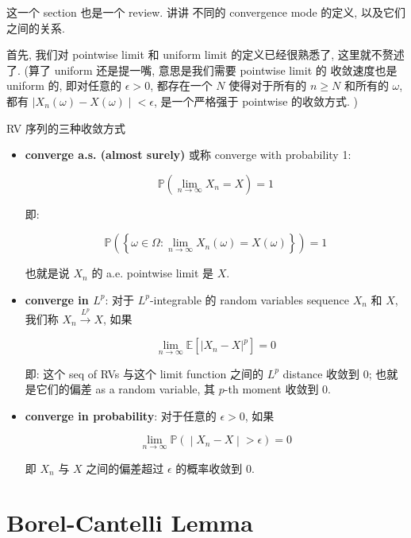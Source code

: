\documentclass{qlnotes-export}
\begin{document}
这一个 section 也是一个 review. 讲讲 不同的 convergence mode 的定义, 以及它们之间的关系.

首先, 我们对 pointwise limit 和 uniform limit 的定义已经很熟悉了, 这里就不赘述了. (算了 uniform 还是提一嘴, 意思是我们需要 pointwise limit 的 收敛速度也是 uniform 的, 即对任意的 \(\epsilon > 0\), 都存在一个 \(N\) 使得对于所有的 \(n \geq N\) 和所有的 \(\omega\), 都有 \(\left. |X_{n}(\omega) - X(\omega) \middle| < \epsilon \right.\), 是一个严格强于 pointwise 的收敛方式. )

\begin{definition}{RV 序列的三种收敛方式}\label{def-04-lln-rv}

\begin{itemize}
\item
  \textbf{converge a.s. (almost surely)} 或称 converge with probability 1:

  \[{\mathbb{P}}\left( {\lim\limits_{n\rightarrow\infty}X_{n} = X} \right) = 1\]

  即:

  \[{\mathbb{P}}\left( \left\{ {\omega \in \Omega:\lim\limits_{n\rightarrow\infty}X_{n}(\omega) = X(\omega)} \right\} \right) = 1\]

  也就是说 \(X_{n}\) 的 a.e. pointwise limit 是 \(X\).
\item
  \textbf{converge in \(L^{p}\)}: 对于 \(L^{p}\)-integrable 的 random variables sequence \(X_{n}\) 和 \(X\), 我们称 \(X_{n}\overset{L^{p}}{\rightarrow}X\), 如果

  \[\lim\limits_{n\rightarrow\infty}{\mathbb{E}}\left\lbrack \left| {X_{n} - X} \right|^{p} \right\rbrack = 0\]

  即: 这个 seq of RVs 与这个 limit function 之间的 \(L^{p}\) distance 收敛到 0; 也就是它们的偏差 as a random variable, 其 \(p\)-th moment 收敛到 0.
\item
  \textbf{converge in probability}: 对于任意的 \(\epsilon > 0\), 如果

  \[\left. \lim\limits_{n\rightarrow\infty}{\mathbb{P}}( \middle| X_{n} - X \middle| > \epsilon) = 0 \right.\]

  即 \(X_{n}\) 与 \(X\) 之间的偏差超过 \(\epsilon\) 的概率收敛到 0.
\end{itemize}

\end{definition}

\section{Borel-Cantelli Lemma}\label{borel-cantelli-lemma}
\end{document}
